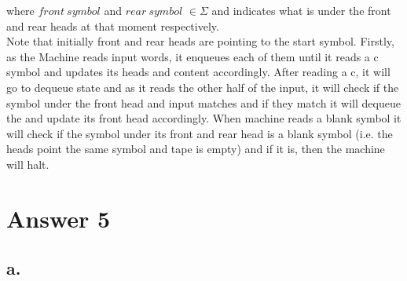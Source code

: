 \documentclass[12pt]{article}
\begin{document}
where $front \ symbol$ and $rear \ symbol$ $\in \Sigma$ and indicates what is under the front and rear heads at that moment respectively. \\

Note that initially front and rear heads are pointing to the start symbol. Firstly, as the Machine reads input words, it enqueues each of them until it reads a c symbol and updates its heads and content accordingly. After reading a c, it will go to dequeue state and as it reads the other half of the input, it will check if the symbol under the front head and input matches and if they match it will dequeue the and update its front head accordingly. When machine reads a blank symbol it will check if the symbol under its front and rear head is a blank symbol (i.e. the heads point the same symbol and tape is empty) and if it is, then the machine will halt.

\section*{Answer 5}

\subsection*{a.}
\end{document}
